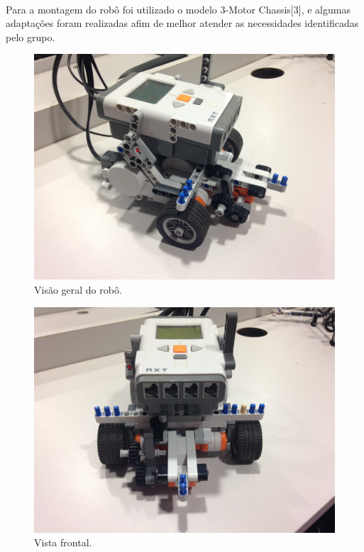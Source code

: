 \documentclass[12pt,a4paper]{article}
\begin{document}
	\paragraph{}
		Para a montagem do robô foi utilizado o modelo 3-Motor Chassis[3], e 
		algumas adaptações foram realizadas afim de melhor atender as 
		necessidades identificadas pelo grupo.

	\begin{figure}[H]
		\includegraphics[width=\linewidth]{../Images/robot_1.JPG}
		\caption{Visão geral do robô.}
		\label{fig:robot_1}
	\end{figure}

	\begin{figure}[H]
		\includegraphics[width=\linewidth]{../Images/robot_2.JPG}
		\caption{Vista frontal.}
		\label{fig:robot_2}
	\end{figure}
\end{document}
